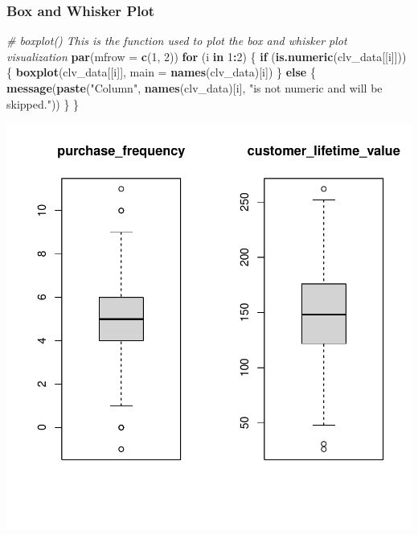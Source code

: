 \documentclass[
]{article}
\newenvironment{Shaded}{\begin{snugshade}}{\end{snugshade}}
\newcommand{\AttributeTok}[1]{\textcolor[rgb]{0.13,0.29,0.53}{#1}}
\newcommand{\CommentTok}[1]{\textcolor[rgb]{0.56,0.35,0.01}{\textit{#1}}}
\newcommand{\ControlFlowTok}[1]{\textcolor[rgb]{0.13,0.29,0.53}{\textbf{#1}}}
\newcommand{\DecValTok}[1]{\textcolor[rgb]{0.00,0.00,0.81}{#1}}
\newcommand{\FunctionTok}[1]{\textcolor[rgb]{0.13,0.29,0.53}{\textbf{#1}}}
\newcommand{\NormalTok}[1]{#1}
\newcommand{\SpecialCharTok}[1]{\textcolor[rgb]{0.81,0.36,0.00}{\textbf{#1}}}
\newcommand{\StringTok}[1]{\textcolor[rgb]{0.31,0.60,0.02}{#1}}
\begin{document}
\subsubsection{\texorpdfstring{\textbf{Box and Whisker
Plot}}{Box and Whisker Plot}}\label{box-and-whisker-plot}

\begin{Shaded}
\begin{Highlighting}[]
\CommentTok{\# \textasciigrave{}boxplot()\textasciigrave{} This is the function used to plot the box and whisker plot visualization}
\FunctionTok{par}\NormalTok{(}\AttributeTok{mfrow =} \FunctionTok{c}\NormalTok{(}\DecValTok{1}\NormalTok{, }\DecValTok{2}\NormalTok{))}
\ControlFlowTok{for}\NormalTok{ (i }\ControlFlowTok{in} \DecValTok{1}\SpecialCharTok{:}\DecValTok{2}\NormalTok{) \{}
  \ControlFlowTok{if}\NormalTok{ (}\FunctionTok{is.numeric}\NormalTok{(clv\_data[[i]])) \{}
    \FunctionTok{boxplot}\NormalTok{(clv\_data[[i]], }\AttributeTok{main =} \FunctionTok{names}\NormalTok{(clv\_data)[i])}
\NormalTok{  \} }\ControlFlowTok{else}\NormalTok{ \{}
    \FunctionTok{message}\NormalTok{(}\FunctionTok{paste}\NormalTok{(}\StringTok{"Column"}\NormalTok{, }\FunctionTok{names}\NormalTok{(clv\_data)[i], }\StringTok{"is not numeric and will be skipped."}\NormalTok{))}
\NormalTok{  \}}
\NormalTok{\}}
\end{Highlighting}
\end{Shaded}

\includegraphics{1_simple_linear_regression_files/figure-latex/visualization_boxplot-1.pdf}
\end{document}
